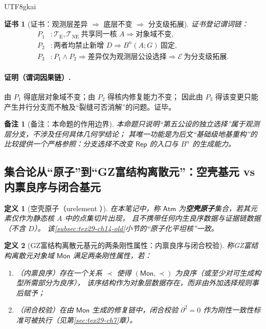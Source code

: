 \documentclass[12pt]{article}
\newtheorem{definition}{定义}[section]
\newtheorem{remark}{备注}[section]
\newtheorem{Certificate}{证书}[section]
\newcommand{\KouJing}{\texorpdfstring{表述约定}{表述约定}}
\newcommand{\GZMonFull}{\texorpdfstring{GZ富结构离散元}{GZ富结构离散元}}
\newcommand{\GZMon}{\texorpdfstring{GZ富结构离散元}{GZ富结构离散元}}
\begin{document}
\begin{CJK*}{UTF8}{gkai}
\begin{Certificate}[证书：观测层差异 $\Rightarrow$ 底层不变 $\Rightarrow$ 分支级拓展]
\label{cert:tex29-ch15-parallel-branch}
证书登记谓词链：
\[
\begin{aligned}
  P_1 &: \mathcal{T}_{\mathrm{E}},\mathcal{T}_{\mathrm{NE}}\ \text{共享同一核 }A\Rightarrow \text{对象域不变},\\
  P_2 &: \text{两者均禁止新增 }D\Rightarrow B^n(A;G)\ \text{固定},\\
  P_3 &: P_1\wedge P_2\Rightarrow \text{差异仅为观测层公设选择}\Rightarrow \mathcal{E}\ \text{为分支级拓展}.
\end{aligned}
\]
\end{Certificate}

\paragraph{证明（谓词因果链）.}
由 $P_1$ 得底层对象域不变；由 $P_2$ 得核内修复能力不变；
因此由 $P_3$ 得该变更只能产生并行分支而不触及“裂缝可否消解”的问题。证毕。

\begin{remark}[备注：本命题的作用边界]
本命题只说明“第五公设的独立选择”属于观测层分支，不涉及任何具体几何学结论；
其唯一功能是为后文“基础级地基重构”的比较提供一个严格参照：分支选择不改变 $\mathsf{Rep}$ 的入口与 $B^n$ 的生成能力。
\end{remark}

\subsection{集合论从“原子”到“\GZMonFull{}”：空壳基元 vs 内禀良序与闭合基元}
\label{subsec:tex29-ch15-atom-to-monad}

\begin{definition}[空壳原子（urelement ）]
在本笔记中，称 $\mathsf{Atm}$ 为\textbf{空壳原子}集合，若其元素仅作为静态核 $A$ 中的点集切片出现，
且不携带任何内生良序数据与证据链数据（不含 $D$）。
该\ref{subsec:tex29-ch14-old}小节的“原子化平坦核”一致。
\end{definition}

\begin{definition}[\GZMon{}基元的两条刚性属性：内禀良序与闭合校验]
称\GZMon{}对象域 $\mathsf{Mon}$ 满足两条刚性属性，若：
\begin{enumerate}
  \item （内禀良序）存在一个关系 $\prec$ 使得 $(\mathsf{Mon},\prec)$ 为良序（或至少对可生成构型所需部分为良序），
  该序结构作为对象层数据存在，而非由外加选择规则事后赋予；
  \item （闭合校验）在由 $\mathsf{Mon}$ 生成的修复链中，闭合校验 $\partial^2=0$ 作为刚性一致性标准可被执行（见第\ref{sec:tex29-ch7}章）。
\end{enumerate}
\end{definition}


\end{CJK*}
\end{document}
